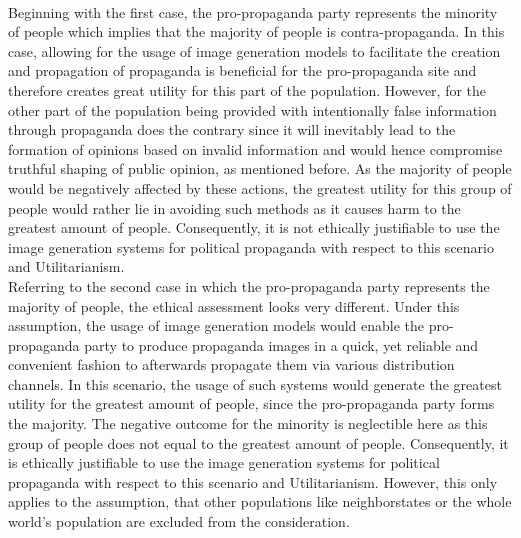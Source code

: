 \documentclass[10pt,twocolumn,twoside]{osajnl}
\begin{document}
\\
Beginning with the first case, the pro-propaganda party represents the minority of people which implies that the majority of people is contra-propaganda. In this case,
allowing for the usage of image generation models to facilitate the creation and propagation of propaganda is beneficial for the pro-propaganda site and therefore creates great utility for this part of the population.
However, for the other part of the population being provided with intentionally false information through propaganda does the contrary since it will inevitably lead to the formation of opinions based on 
invalid information and would hence compromise truthful shaping of public opinion, as mentioned before. 
As the majority of people would be negatively affected by these actions, the greatest utility for this group of people would rather lie in avoiding such methods as it causes harm to the greatest amount of people. 
Consequently, it is not ethically justifiable to use the image generation systems for political propaganda with respect to this scenario and Utilitarianism.
\\
Referring to the second case in which the pro-propaganda party represents the majority of people, the ethical assessment looks very different.
Under this assumption, the usage of image generation models would enable the pro-propaganda party to produce propaganda images in a quick, yet reliable and convenient fashion to afterwards 
propagate them via various distribution channels. In this scenario, the usage of such systems would generate the greatest utility for the greatest amount of people, since the pro-propaganda party 
forms the majority. The negative outcome for the minority is neglectible here as this group of people does not equal to the greatest amount of people. Consequently, it is ethically justifiable to use the 
image generation systems for political propaganda with respect to this scenario and Utilitarianism. 
However, this only applies to the assumption, that other populations like neighborstates or the whole world's population are excluded from the consideration. 
\end{document}
